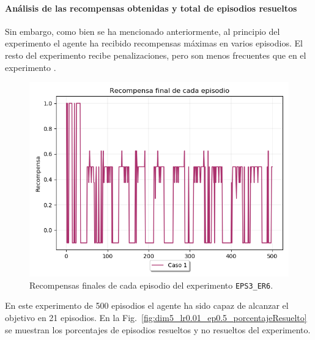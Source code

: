 \paragraph{Análisis de las recompensas obtenidas y total de episodios resueltos} 

Sin embargo, como bien se ha mencionado anteriormente, al principio del experimento el agente ha recibido recompensas máximas en varios episodios. El resto del experimento recibe penalizaciones, pero son menos frecuentes que en el experimento . \\

\begin{figure}
    \centering
    \includegraphics[scale=0.4]{cap5_experimentacion/images/dim5_lr0.01_ep0.5_recompensa.png}
    \caption{Recompensas finales de cada episodio del experimento \texttt{EPS3\_ER6}.}
    \label{fig:dim5_lr0.01_ep0.5_recompensa}
\end{figure}

En este experimento de 500 episodios el agente ha sido capaz de alcanzar el objetivo en 21 episodios. En la Fig.~\ref{fig:dim5_lr0.01_ep0.5_porcentajeResuelto} se muestran los porcentajes de episodios resueltos y no resueltos del experimento.

